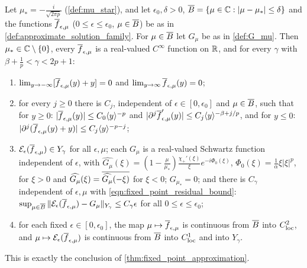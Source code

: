 \begin{lemma}
  \label{lem:approx_assembly}
  Let $\mu_*=-\frac{i}{\sqrt{2\pi p}}$ (\cref{def:mu_star}), and let $\epsilon_0,\delta>0$,
  $\overline{B}=\{\mu\in\mathbb{C}:|\mu-\mu_*|\le\delta\}$ and the functions $\overline{f}_{\epsilon,\mu}$
  ($0\le\epsilon\le\epsilon_0$, $\mu\in\overline{B}$) be as in \cref{def:approximate_solution_family}. For $\mu\in\overline{B}$ let
  $G_\mu$ be as in \cref{def:G_mu}. Then $\mu_*\in\mathbb{C}\setminus\{0\}$, every $\overline{f}_{\epsilon,\mu}$ is a real-valued
  $C^\infty$ function on $\mathbb{R}$, and for every $\gamma$ with $\beta+\frac1p<\gamma<2p+1$:
  \begin{enumerate}
    \item $\lim_{y\to-\infty}[\overline{f}_{\epsilon,\mu}(y)+y]=0$ and $\lim_{y\to\infty}\overline{f}_{\epsilon,\mu}(y)=0$;
    \item for every $j\ge0$ there is $C_j$, independent of $\epsilon\in[0,\epsilon_0]$ and $\mu\in\overline{B}$, such that
      for $y\ge0$: $|\overline{f}_{\epsilon,\mu}(y)|\le C_0\langle y \rangle^{-p}$ and $|\partial^j\overline{f}_{\epsilon,\mu}'(y)|\le C_j\langle y \rangle^{-\beta+j/p}$,
      and for $y\le0$: $|\partial^j(\overline{f}_{\epsilon,\mu}(y)+y)|\le C_j\langle y \rangle^{-p-j}$;
    \item $\mathcal{E}_\epsilon(\overline{f}_{\epsilon,\mu})\in Y_\gamma$ for all $\epsilon,\mu$; each $G_\mu$ is a real-valued Schwartz
      function independent of $\epsilon$, with $\widehat{G_\mu}(\xi)=(1-\frac\mu{\mu_*})\frac{\chi_+'(\xi)}{\xi}e^{-i\Phi_0(\xi)}$,
      $\Phi_0(\xi)=\frac1\alpha\xi|\xi|^p$, for $\xi>0$ and $\widehat{G_\mu}(\xi)=\overline{\widehat{G_\mu}(-\xi)}$ for $\xi<0$;
      $G_{\mu_*}=0$; and there is $C_\gamma$ independent of $\epsilon,\mu$ with
      \eqref{eqn:fixed_point_residual_bound}: $\sup_{\mu\in\overline{B}}\|\mathcal{E}_\epsilon(\overline{f}_{\epsilon,\mu})-G_\mu\|_{Y_\gamma}\le C_\gamma\epsilon$ for all $0\le\epsilon\le\epsilon_0$;
    \item for each fixed $\epsilon\in[0,\epsilon_0]$, the map $\mu\mapsto\overline{f}_{\epsilon,\mu}$ is continuous from $\overline{B}$
      into $C^2_{\textup{loc}}$, and $\mu\mapsto\mathcal{E}_\epsilon(\overline{f}_{\epsilon,\mu})$ is continuous from $\overline{B}$ into $C^1_{\textup{loc}}$
      and into $Y_\gamma$.
  \end{enumerate}
  This is exactly the conclusion of \cref{thm:fixed_point_approximation}.
\end{lemma}
